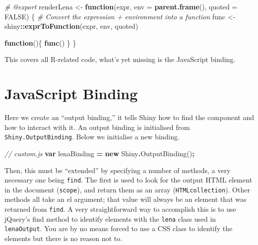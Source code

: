 \documentclass[
]{krantz}
\makeatletter
\newenvironment{Shaded}{\begin{snugshade}}{\end{snugshade}}
\newcommand{\CommentTok}[1]{\textcolor[rgb]{0.37,0.37,0.37}{\textit{#1}}}
\newcommand{\ControlFlowTok}[1]{\textcolor[rgb]{0.27,0.27,0.27}{\textbf{#1}}}
\newcommand{\DataTypeTok}[1]{\textcolor[rgb]{0.27,0.27,0.27}{#1}}
\newcommand{\FunctionTok}[1]{\textcolor[rgb]{0,0,0}{#1}}
\newcommand{\KeywordTok}[1]{\textcolor[rgb]{0.27,0.27,0.27}{\textbf{#1}}}
\newcommand{\NormalTok}[1]{#1}
\newcommand{\OperatorTok}[1]{\textcolor[rgb]{0.43,0.43,0.43}{\textbf{#1}}}
\newcommand{\OtherTok}[1]{\textcolor[rgb]{0.37,0.37,0.37}{#1}}
\newcommand{\StringTok}[1]{\textcolor[rgb]{0.5,0.5,0.5}{#1}}
\newenvironment{kframe}{%
\medskip{}
\setlength{\fboxsep}{.8em}
 \def\at@end@of@kframe{}%
 \ifinner\ifhmode%
  \def\at@end@of@kframe{\end{minipage}}%
  \begin{minipage}{\columnwidth}%
 \fi\fi%
 \def\FrameCommand##1{\hskip\@totalleftmargin \hskip-\fboxsep
 \colorbox{shadecolor}{##1}\hskip-\fboxsep
     \hskip-\linewidth \hskip-\@totalleftmargin \hskip\columnwidth}%
 \MakeFramed {\advance\hsize-\width
   \@totalleftmargin\z@ \linewidth\hsize
   \@setminipage}}%
 {\par\unskip\endMakeFramed%
 \at@end@of@kframe}
\renewenvironment{Shaded}{\begin{kframe}}{\end{kframe}}
\makeatother
\begin{document}
\begin{Shaded}
\begin{Highlighting}[]
\CommentTok{\#\textquotesingle{} @export}
\NormalTok{renderLena \textless{}{-}}\StringTok{ }\ControlFlowTok{function}\NormalTok{(expr, }\DataTypeTok{env =} \KeywordTok{parent.frame}\NormalTok{(), }\DataTypeTok{quoted =} \OtherTok{FALSE}\NormalTok{) \{}
  \CommentTok{\# Convert the expression + environment into a function}
\NormalTok{  func \textless{}{-}}\StringTok{ }\NormalTok{shiny}\OperatorTok{::}\KeywordTok{exprToFunction}\NormalTok{(expr, env, quoted)}

  \ControlFlowTok{function}\NormalTok{()\{}
    \KeywordTok{func}\NormalTok{()}
\NormalTok{  \}}
\NormalTok{\}}
\end{Highlighting}
\end{Shaded}

This covers all R-related code, what's yet missing is the JavaScript binding.

\hypertarget{javascript-binding}{%
\section*{JavaScript Binding}\label{javascript-binding}}


Here we create an ``output binding,'' it tells Shiny how to find the component and how to interact with it. An output binding is initialised from \texttt{Shiny.OutputBinding}. Below we initialise a new binding.

\begin{Shaded}
\begin{Highlighting}[]
\CommentTok{// custom.js}
\KeywordTok{var}\NormalTok{ lenaBinding }\OperatorTok{=} \KeywordTok{new}\NormalTok{ Shiny}\OperatorTok{.}\FunctionTok{OutputBinding}\NormalTok{()}\OperatorTok{;}
\end{Highlighting}
\end{Shaded}

Then, this must be ``extended'' by specifying a number of methods, a very necessary one being \texttt{find}. The first is used to look for the output HTML element in the document (\texttt{scope}), and return them as an array (\texttt{HTMLcollection}). Other methods all take an el argument; that value will always be an element that was returned from \texttt{find}. A very straightforward way to accomplish this is to use jQuery's find method to identify elements with the \texttt{lena} class used in \texttt{lenaOutput}. You are by no means forced to use a CSS class to identify the elements but there is no reason not to.
\end{document}
